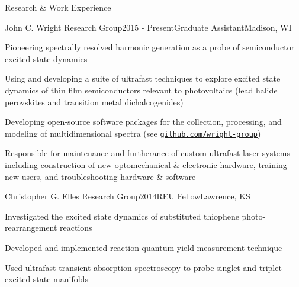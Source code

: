 \documentclass{resume} %
\begin{document}
\begin{rSection}{Research \& Work Experience}

\begin{rSubsection}{John C. Wright Research Group}{2015 - Present}{Graduate Assistant}{Madison, WI}
\item Pioneering spectrally resolved harmonic generation as a probe of semiconductor excited state dynamics
\item Using and developing a suite of ultrafast techniques to explore excited state dynamics of thin film semiconductors relevant to photovoltaics (lead halide perovskites and transition metal dichalcogenides)%
\item Developing open-source software packages for the  collection, processing, and modeling of multidimensional spectra (see \href{http://github.com/wright-group}{\texttt{github.com/wright-group}})
\item Responsible for maintenance and furtherance of custom ultrafast laser systems including construction of new optomechanical \& electronic hardware, training new users, and troubleshooting hardware \& software

\end{rSubsection}

\begin{rSubsection}{Christopher G. Elles Research Group}{2014}{REU Fellow}{Lawrence, KS}
	\item Investigated the excited state dynamics of substituted thiophene photo-rearrangement reactions
	\item Developed and implemented reaction quantum yield measurement technique
	\item Used ultrafast transient absorption spectroscopy to probe singlet and triplet excited state manifolds
\end{rSubsection}


\end{rSection}
\end{document}
